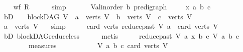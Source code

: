 \begin{isabellebody}
\ \ \isamarkupfalse%
\ {\isachardoublequoteopen}wf\ {\isacharquery}{\kern0pt}R{\isachardoublequoteclose}\isanewline
\ \ \ \ \isamarkupfalse%
\ simp\ \isanewline
{}\isamarkupfalse%
\ \isanewline
\ \ \isamarkupfalse%
\ V{\isacharcolon}{\kern0pt}{\isacharcolon}{\kern0pt}{\isachardoublequoteopen}{\isacharparenleft}{\kern0pt}{\isacharprime}{\kern0pt}a{\isacharcolon}{\kern0pt}{\isacharcolon}{\kern0pt}linorder{\isacharcomma}{\kern0pt}\ {\isacharprime}{\kern0pt}b{\isacharparenright}{\kern0pt}\ pre{\isacharunderscore}{\kern0pt}digraph{\isachardoublequoteclose}\ \isanewline
\ \ \isamarkupfalse%
\ x\ a\ b\ c\isanewline
\ \ \isamarkupfalse%
\ bD{\isacharcolon}{\kern0pt}\ {\isachardoublequoteopen}\ {\isasymnot}\ {\isacharparenleft}{\kern0pt}{\isasymnot}\ blockDAG\ V\ {\isasymor}\ a\ {\isasymnotin}\ verts\ V\ {\isasymor}\ b\ {\isasymnotin}\ verts\ V\ {\isasymor}\ c\ {\isasymnotin}\ verts\ V{\isacharparenright}{\kern0pt}{\isachardoublequoteclose}\isanewline
\ \ \isamarkupfalse%
\ \isamarkupfalse%
\ {\isachardoublequoteopen}a\ {\isasymin}\ verts\ V{\isachardoublequoteclose}\ \ \isamarkupfalse%
\ simp\isanewline
\ \ \isamarkupfalse%
\ \isamarkupfalse%
\ {\isachardoublequoteopen}card\ {\isacharparenleft}{\kern0pt}verts\ {\isacharparenleft}{\kern0pt}reduce{\isacharunderscore}{\kern0pt}past\ V\ a{\isacharparenright}{\kern0pt}{\isacharparenright}{\kern0pt}\ {\isacharless}{\kern0pt}\ card\ {\isacharparenleft}{\kern0pt}verts\ V{\isacharparenright}{\kern0pt}{\isachardoublequoteclose}\ \ \ \isanewline
\ \ \ \ \isamarkupfalse%
\ bD\ blockDAG{\isachardot}{\kern0pt}reduce{\isacharunderscore}{\kern0pt}less\isanewline
\ \ \ \ \isamarkupfalse%
\ metis\isanewline
\ \ \isamarkupfalse%
\ \isamarkupfalse%
\ {\isachardoublequoteopen}{\isacharparenleft}{\kern0pt}{\isacharparenleft}{\kern0pt}reduce{\isacharunderscore}{\kern0pt}past\ V\ a{\isacharcomma}{\kern0pt}\ x{\isacharcomma}{\kern0pt}\ b{\isacharcomma}{\kern0pt}\ c{\isacharparenright}{\kern0pt}{\isacharcomma}{\kern0pt}\ V{\isacharcomma}{\kern0pt}\ a{\isacharcomma}{\kern0pt}\ b{\isacharcomma}{\kern0pt}\ c{\isacharparenright}{\kern0pt}\isanewline
\ \ \ \ \ \ \ {\isasymin}\ measures\isanewline
\ \ \ \ \ \ \ \ \ \ \ {\isacharbrackleft}{\kern0pt}{\isasymlambda}{\isacharparenleft}{\kern0pt}V{\isacharcomma}{\kern0pt}\ a{\isacharcomma}{\kern0pt}\ b{\isacharcomma}{\kern0pt}\ c{\isacharparenright}{\kern0pt}{\isachardot}{\kern0pt}\ card\ {\isacharparenleft}{\kern0pt}verts\ V{\isacharparenright}{\kern0pt}{\isacharcomma}{\kern0pt}\ \ \isanewline

\end{isabellebody}
